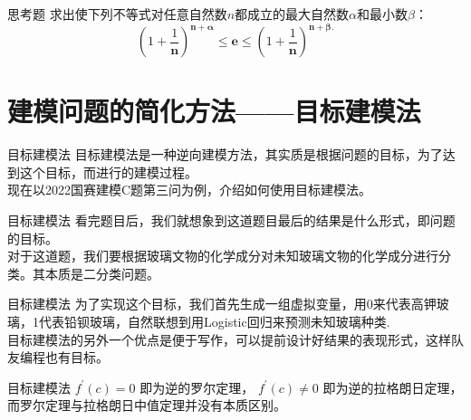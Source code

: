 \documentclass{beamer}
\begin{document}
\begin{frame}{思考题}
		求出使下列不等式对任意自然数$n$都成立的最大自然数$\alpha$和最小数$\beta \text{：}$
		$$
		\left( 1+\frac{1}{\boldsymbol{n}} \right) ^{\boldsymbol{n}+\boldsymbol{\alpha }}\le \boldsymbol{e}\le \left( 1+\frac{1}{\boldsymbol{n}} \right) ^{\boldsymbol{n}+\boldsymbol{\beta }.}
		$$
\end{frame}

\section{建模问题的简化方法——目标建模法}

\begin{frame}{目标建模法}
目标建模法是一种逆向建模方法，其实质是根据问题的目标，为了达到这个目标，而进行的建模过程。\\
现在以2022国赛建模C题第三问为例，介绍如何使用目标建模法。
\end{frame}
\begin{frame}{目标建模法}
看完题目后，我们就想象到这道题目最后的结果是什么形式，即问题的目标。\\
对于这道题，我们要根据玻璃文物的化学成分对未知玻璃文物的化学成分进行分类。其本质是二分类问题。
\end{frame}
\begin{frame}{目标建模法}
为了实现这个目标，我们首先生成一组虚拟变量，用0来代表高钾玻璃，1代表铅钡玻璃，自然联想到用Logistic回归来预测未知玻璃种类.\\
目标建模法的另外一个优点是便于写作，可以提前设计好结果的表现形式，这样队友编程也有目标。
\end{frame}

\begin{frame}{目标建模法}
$
f^{'}\left( c \right) =0
$
即为逆的罗尔定理，
$f^{'}\left( c \right) \ne 0$
即为逆的拉格朗日定理，而罗尔定理与拉格朗日中值定理并没有本质区别。
\end{frame}
\end{document}
